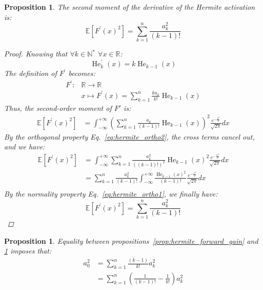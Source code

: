 \documentclass{article} %
\theoremstyle{plain}
\newtheorem{proposition}[theorem]{Proposition}
\theoremstyle{definition}
\theoremstyle{remark}
\begin{document}
\begin{proposition}
\label{prop:hermite_backward_gain}
The second moment of the derivative of the Hermite activation is:
 \begin{equation}
    \mathbb{E}\left[F^\prime(x)^2\right]=\sum^{n}_{k=1}\frac{a_k^2}{(k-1)!}
\end{equation}
\begin{proof}
Knowing that $\forall k \in \mathbb{N}^*$ $\forall x \in \mathbb{R}$:
\begin{equation}
    \operatorname{He}_k^\prime(x) = k \operatorname{He}_{k-1}(x)
\end{equation}
The definition of $F^\prime$ becomes:
\begin{align}
    F^\prime \colon & \mathbb{R} \to \mathbb{R}  \nonumber \\
     & x \mapsto F^\prime(x)=\sum^{n}_{k=1} \frac{ka_k} {k!}\operatorname{He}_{k-1}(x)
\end{align}
Thus, the second-order moment of $F'$ is:
\begin{align}
    \mathbb{E}\left[F^\prime(x)^2\right]&=\int_{-\infty}^{+\infty}\left(\sum^{n}_{k=1} \frac{a_k} {(k-1)!}\operatorname{He}_{k-1}(x)\right)^2 \frac{e^{-\frac{x^2}{2}}}{\sqrt{2\pi}} d x
\end{align}
By the orthogonal property Eq.~\ref{eq:hermite_ortho2}, the cross terms cancel out, and we have:
\begin{align}
    \mathbb{E}\left[F^\prime(x)^2\right]&=\int_{-\infty}^{+\infty}\sum^{n}_{k=1} \frac{a_k^2} {((k-1)!)^2}\operatorname{He}_{k-1}(x)^2 \frac{e^{-\frac{x^2}{2}}}{\sqrt{2\pi}} d x \\
    &=\sum^{n}_{k=1}\frac{a_k^2} {(k-1)!} \int_{-\infty}^{+\infty}\frac{\operatorname{He}_{k-1}(x)^2}{(k-1)!} \frac{e^{-\frac{x^2}{2}}}{\sqrt{2\pi}} d x \\
\end{align}
By the normality property Eq.~\ref{eq:hermite_ortho1}, we finally have:
\begin{equation}
    \mathbb{E}\left[F^\prime(x)^2\right]=\sum^{n}_{k=1}\frac{a_k^2}{(k-1)!}
\end{equation}
\end{proof}
\end{proposition}
\begin{proposition}
\label{prop:hermite_equality}
    Equality between propositions~\ref{prop:hermite_forward_gain} and \ref{prop:hermite_backward_gain} imposes that:
\begin{align}
    a_0^2 &= \sum^{n}_{k=1} \frac{(k-1)}{k!}a_k^2\\
    &= \sum^{n}_{k=1} \left(\frac{1}{(k-1)!} - \frac{1}{k!}\right)a_k^2
\end{align}
\end{proposition}
\end{document}
